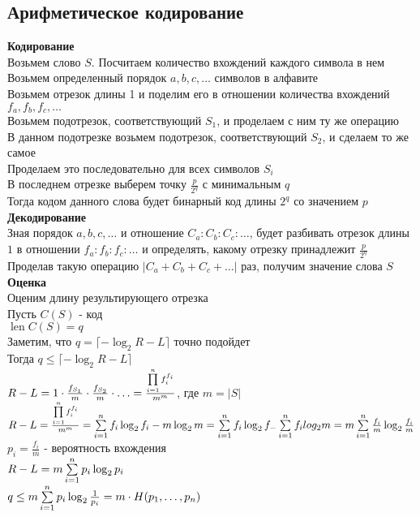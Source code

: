 \documentclass[12pt]{article}
\begin{document}
\subsection{Арифметическое кодирование}
\textbf{Кодирование}\\
Возьмем слово $S$. Посчитаем количество вхождений каждого символа в нем\\
Возьмем определенный порядок $a,b,c,\ldots$ символов в алфавите\\
Возьмем отрезок длины 1 и поделим его в отношении количества вхождений $f_a, f_b, f_c,\ldots$\\
Возьмем подотрезок, соответствующий $S_1$, и проделаем с ним ту же операцию\\
В данном подотрезке возьмем подотрезок, соответствующий $S_2$, и сделаем то же самое\\
Проделаем это последовательно для всех символов $S_i$\\
В последнем отрезке выберем точку $\frac{p}{2^q}$ с минимальным $q$\\
Тогда кодом данного слова будет бинарный код длины $2^q$ со значением $p$\\
\textbf{Декодирование}\\
Зная порядок $a,b,c,\ldots$ и отношение $C_a:C_b:C_c:\ldots$, будет разбивать отрезок длины $1$ в отношении $f_a:f_b:f_c:\ldots$ и определять, какому отрезку принадлежит $\frac{p}{2^q}$\\
Проделав такую операцию $|C_a+C_b+C_c+\ldots|$ раз, получим значение слова $S$\\
\textbf{Оценка}\\
Оценим длину результирующего отрезка\\
Пусть $C(S)$ - код\\
$\operatorname{len} C(S) = q$\\
Заметим, что $q = \lceil -\log_2 R-L \rceil$ точно подойдет\\
Тогда $q \leq \lceil -\log_2 R-L \rceil$\\
$R-L = 1\cdot\frac{f_{S_1}}{m}\cdot\frac{f_{S_2}}{m}\cdot\ldots = \frac{\prod\limits_{i=1}^n f_i^{f_i}}{m^m}$, где $m = |S|$\\
$R-L = \frac{\prod\limits_{i=1}^n f_i^{f_i}}{m^m} = \sum\limits_{i=1}^n f_i\log_2 f_i - m\log_2 m = \sum\limits_{i=1}^n f_i\log_2 f_ - \sum\limits_{i=1}^n f_i log_2 m = m\sum\limits_{i=1}^n \frac{f_i}{m}\log_2\frac{f_i}{m}$\\
$p_i = \frac{f_i}m$ - вероятность вхождения\\
$R-L = m\sum\limits_{i=1}^n p_i\log_2 p_i$\\
$q \leq m\sum\limits_{i=1}^n p_i\log_2 \frac1{p_i} = m\cdot H(p_1,\ldots,p_n)$
\end{document}
